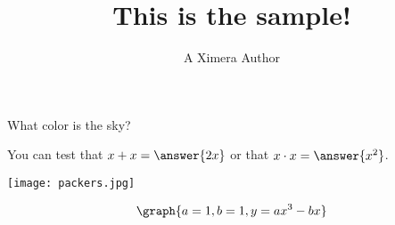 \documentclass{ximera}
\title{This is the sample!}
\author{A Ximera Author}
\begin{document}
\maketitle

What color is the sky?

\begin{problem}
\begin{multipleChoice}
\end{multipleChoice}
\end{problem}

\begin{problem}
   You can test that $x + x = \answer{2x}$ or that $x \cdot x = \answer{x^2}$.
\end{problem}

\begin{image}
\texttt{[image: packers.jpg]}
\end{image}

\[
\graph{a=1,b=1,y=ax^3-bx}
\]
\end{document}
